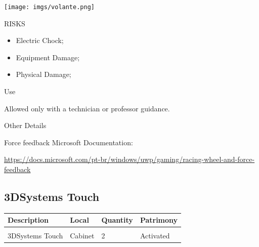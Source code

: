 \begin{multicols}{2}

\texttt{[image: imgs/volante.png]}

\columnbreak

\begin{mdframed}[roundcorner=10pt, linecolor=red, linewidth=2pt]
\vspace{1em}
{\Large {\color{red}RISKS}}
\vspace{1em}

\begin{itemize}
    \item Electric Chock;
    \item Equipment Damage;
    \item Physical Damage;
\end{itemize}

\vspace{1em}
\end{mdframed}

\vspace{2em}

{\Large Use}
\vspace{1em}

Allowed only with a technician or professor guidance.
\end{multicols}

{\Large Other Details}
\vspace{1em}

Force feedback Microsoft Documentation:

\hspace{3em}\url{https://docs.microsoft.com/pt-br/windows/uwp/gaming/racing-wheel-and-force-feedback}
\newpage


\subsection{3DSystems Touch}
\begin{tabularx}{\textwidth}{ Y  Y  Y  Y }
    \textbf{Description} &  \textbf{Local} &  \textbf{Quantity} & \textbf{Patrimony}\\
    \hline \\
     3DSystems Touch & Cabinet & 2 & Activated
\end{tabularx}
\vspace{1cm}

